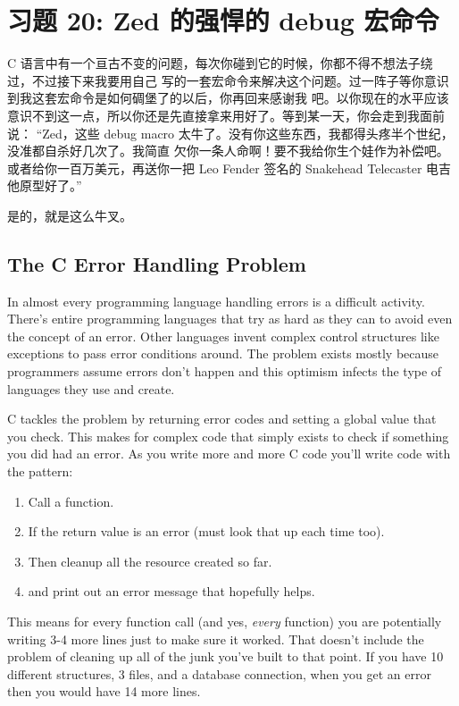 \chapter{习题 20: Zed 的强悍的 debug 宏命令}

C 语言中有一个亘古不变的问题，每次你碰到它的时候，你都不得不想法子绕过，不过接下来我要用自己
写的一套宏命令来解决这个问题。过一阵子等你意识到我这套宏命令是如何碉堡了的以后，你再回来感谢我
吧。以你现在的水平应该意识不到这一点，所以你还是先直接拿来用好了。等到某一天，你会走到我面前说：
“Zed，这些 debug macro 太牛了。没有你这些东西，我都得头疼半个世纪，没准都自杀好几次了。我简直
欠你一条人命啊！要不我给你生个娃作为补偿吧。或者给你一百万美元，再送你一把 Leo Fender 
签名的 Snakehead Telecaster 电吉他原型好了。”

是的，就是这么牛叉。

\section{The C Error Handling Problem}

In almost every programming language handling errors is a difficult activity.
There's entire programming languages that try as hard as they can to avoid even
the concept of an error.  Other languages invent complex control structures
like exceptions to pass error conditions around.  The problem exists mostly
because programmers assume errors don't happen and this optimism infects the
type of languages they use and create.

C tackles the problem by returning error codes and setting a global
 value that you check.  This makes for complex code that
simply exists to check if something you did had an error.  As you 
write more and more C code you'll write code with the pattern:

\begin{enumerate}
\item Call a function.
\item If the return value is an error (must look that up each time too).
\item Then cleanup all the resource created so far.
\item and print out an error message that hopefully helps.
\end{enumerate}

This means for every function call (and yes, \emph{every} function)
you are potentially writing 3-4 more lines just to make sure it worked.
That doesn't include the problem of cleaning up all of the junk you've
built to that point.  If you have 10 different structures, 3 files, and
a database connection, when you get an error then you
would have 14 more lines.

